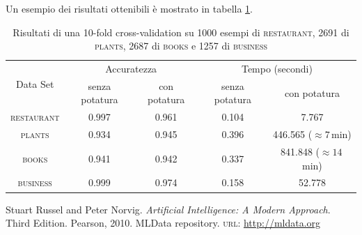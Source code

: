 \documentclass{article}
\newcommand{\restaurant}{\textsc{restaurant}}
\newcommand{\plants}{\textsc{plants}}
\newcommand{\books}{\textsc{books}}
\newcommand{\business}{\textsc{business}}
\begin{document}
	Un esempio dei risultati ottenibili è mostrato in tabella \ref{tab:cross}.
	
	\begin{table}[t]
		\centering
		\begin{tabular}{|c|c|c|c|c|}
			\hline
			\multirow{2}{*}{Data Set} & \multicolumn{2}{|c|}{Accuratezza} & \multicolumn{2}{|c|}{Tempo (secondi)} \\
			\cline{2-5}
			& senza potatura & con potatura & senza potatura & con potatura \\
			\hline
			\restaurant & 0.997 & 0.961 & 0.104 & 7.767 \\
			\hline
			\plants & 0.934 & 0.945 & 0.396 & 446.565 ($\approx7\,$min) \\
			\hline
			\books & 0.941 & 0.942 & 0.337 & 841.848 ($\approx14\,$min) \\
			\hline
			\business & 0.999 & 0.974 & 0.158 & 52.778 \\
			\hline
		\end{tabular}
		\caption{Risultati di una 10-fold cross-validation su 1000 esempi di \restaurant, 2691 di \plants, 2687 di \books{} e 1257 di \business}
		\label{tab:cross}
	\end{table}
	
	\begin{thebibliography}{9}
			Stuart Russel and Peter Norvig.
			\emph{Artificial Intelligence: A Modern Approach}.
			Third Edition.
			Pearson, 2010.
		MLData repository. \textsc{url}: \url{http://mldata.org}
	
	\end{thebibliography}
\end{document}
